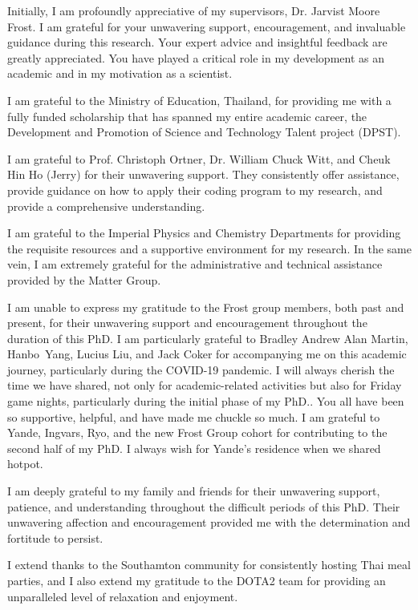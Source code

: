 Initially, I am profoundly appreciative of my supervisors, Dr. Jarvist Moore Frost.  I am grateful for your unwavering support, encouragement, and invaluable guidance during this research.  Your expert advice and insightful feedback are greatly appreciated.
You have played a critical role in my development as an academic and in my motivation as a scientist.

I am grateful to the Ministry of Education, Thailand, for providing me with a fully funded scholarship that has spanned my entire academic career, the Development and Promotion of Science and Technology Talent project (DPST). 

I am grateful to Prof. Christoph Ortner, Dr. William Chuck Witt, and Cheuk Hin Ho (Jerry) for their unwavering support.  They consistently offer assistance, provide guidance on how to apply their coding program to my research, and provide a comprehensive understanding.

I am grateful to the Imperial Physics and Chemistry Departments for providing the requisite resources and a supportive environment for my research.  In the same vein, I am extremely grateful for the administrative and technical assistance provided by the Matter Group. 

I am unable to express my gratitude to the Frost group members, both past and present, for their unwavering support and encouragement throughout the duration of this PhD.  I am particularly grateful to Bradley Andrew Alan Martin, Hanbo~Yang, Lucius Liu, and Jack Coker for accompanying me on this academic journey, particularly during the COVID-19 pandemic.  I will always cherish the time we have shared, not only for academic-related activities but also for Friday game nights, particularly during the initial phase of my PhD..  You all have been so supportive, helpful, and have made me chuckle so much.  I am grateful to Yande, Ingvars, Ryo, and the new Frost Group cohort for contributing to the second half of my PhD. I always wish for Yande's residence when we shared hotpot. 

I am deeply grateful to my family and friends for their unwavering support, patience, and understanding throughout the difficult periods of this PhD. Their unwavering affection and encouragement provided me with the determination and fortitude to persist. 

I extend thanks to the Southamton community for consistently hosting Thai meal parties, and I also extend my gratitude to the DOTA2 team for providing an unparalleled level of relaxation and enjoyment.

